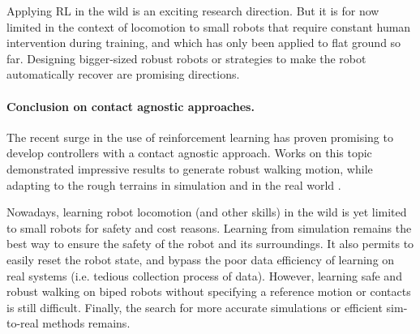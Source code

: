 Applying RL in the wild is an exciting research direction. But it is for now limited in the context of locomotion to small robots that require constant human intervention during training, and which has only been applied to flat ground so far.
Designing bigger-sized robust robots or strategies to make the robot automatically recover \cite{leo_robot_2010} are promising directions.

\hfill \break

\paragraph{Conclusion on contact agnostic approaches.}
The recent surge in the use of reinforcement learning has proven promising to develop controllers with a contact agnostic approach.
Works on this topic demonstrated impressive results to generate robust walking motion, while adapting to the rough terrains in simulation \cite{VAE_jungdam_2022} and in the real world \cite{yang2022safe}.

Nowadays, learning robot locomotion (and other skills) in the wild is yet limited to small robots for safety and cost reasons.
Learning from simulation remains the best way to ensure the safety of the robot and its surroundings.
It also permits to easily reset the robot state, and bypass the poor data efficiency of learning on real systems \cite{atrias_rl_sim_to_real} (i.e. tedious collection process of data). 
However, learning safe and robust walking on biped robots without specifying a reference motion or contacts is still difficult.
Finally, the search for more accurate simulations or efficient sim-to-real methods remains.



